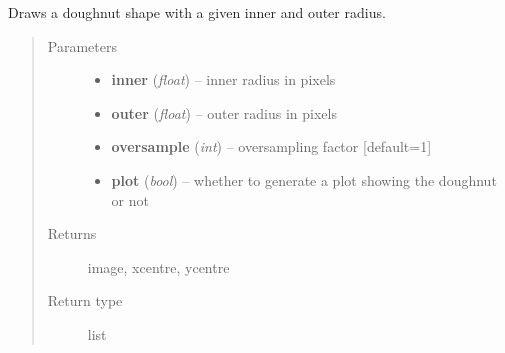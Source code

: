 \documentclass[a4paper,11pt,english]{sphinxmanual}
\begin{document}
\begin{fulllineitems}
\label{reduction:analysis.analyseGhosts.drawDoughnut}
Draws a doughnut shape with a given inner and outer radius.
\begin{quote}\begin{description}
\item[{Parameters}] \leavevmode\begin{itemize}
\item {} 
\textbf{inner} (\emph{float}) -- inner radius in pixels

\item {} 
\textbf{outer} (\emph{float}) -- outer radius in pixels

\item {} 
\textbf{oversample} (\emph{int}) -- oversampling factor {[}default=1{]}

\item {} 
\textbf{plot} (\emph{bool}) -- whether to generate a plot showing the doughnut or not

\end{itemize}

\item[{Returns}] \leavevmode
image, xcentre, ycentre

\item[{Return type}] \leavevmode
list

\end{description}\end{quote}

\end{fulllineitems}

\end{document}
